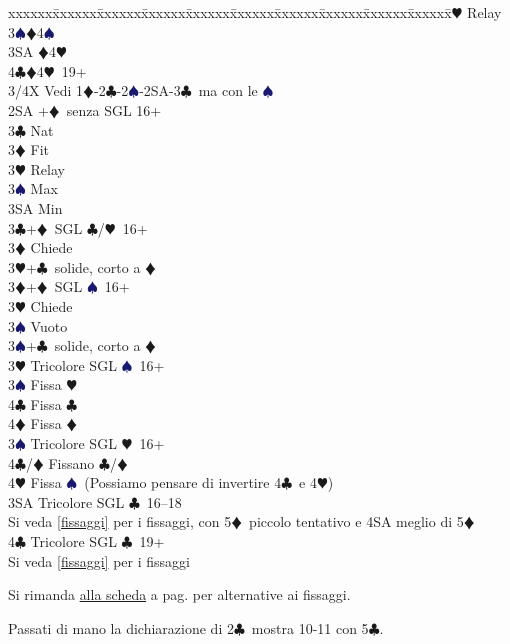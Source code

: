 \documentclass[a4paper,italian]{article}
\newcommand{\BC}{\textcolor{OliveGreen}{$\clubsuit$}}
\newcommand{\BD}{\textcolor{RedOrange}{$\vardiamondsuit$}}
\newcommand{\BH}{\textcolor{Red2}{$\varheartsuit${}}}
\newcommand{\BS}{\textcolor{MidnightBlue}{$\spadesuit${}}}
\newenvironment{bidtable}
{\begin{tabbing}

    xxxxxx\=xxxxxx\=xxxxxx\=xxxxxx\=xxxxxx\=xxxxxx\=xxxxxx\=xxxxxx\=xxxxxx\=xxxxxx\=\kill}
{\end{tabbing} }%
\begin{document}
\begin{bidtable}
    3\BH \> Relay\+\\
    3\BS {}\BD 4\BS \\
    3\small{SA} \BD 4\BH \\
    4\BC {}\BD 4\BH\ 19+\-\-\\
    3/4X \> Vedi 1\BD -2\BC -2\BS -2\small{SA}-3\BC\ ma con le \BS \-\-\\
    2\small{SA} +\BD\ senza SGL 16+\+\\
    3\BC \> Nat\\
    3\BD \> Fit\\
    3\BH \> Relay\+\\
    3\BS \> Max\\
    3\small{SA} \> Min\-\-\\
    3\BC {}+\BD\ SGL \BC /\BH\ 16+\+\\
    3\BD \> Chiede\\
    3\BH {}+\BC\ solide, corto a \BD \-\\
    3\BD {}+\BD\ SGL \BS\ 16+\+\\
    3\BH \> Chiede\+\\
    3\BS \> Vuoto\-\\
    3\BS {}+\BC\ solide, corto a \BD \-\\
    3\BH \> Tricolore SGL \BS\ 16+\+\\
    3\BS \> Fissa \BH \\
    4\BC \> Fissa \BC \\
    4\BD \> Fissa \BD \-\\
    3\BS \> Tricolore SGL \BH\ 16+\+\\
    4\BC/\BD \> Fissano \BC /\BD \\
    4\BH \> Fissa \BS\ (Possiamo pensare di invertire 4\BC\ e 4\BH )\-\\
    3\small{SA} \> Tricolore SGL \BC\ 16--18\+\\
    Si veda \ref{fissaggi} per i fissaggi, con 5\BD\ piccolo tentativo e 4\small{SA} meglio di 5\BD\-\\
    4\BC \> Tricolore SGL \BC\ 19+\+\\
    Si veda \ref{fissaggi} per i fissaggi\-\-
\end{bidtable}
\bigbreak
Si rimanda \hyperref[fissaggi]{alla scheda} a pag. \pageref{fissaggi} per alternative ai fissaggi.

Passati di mano la dichiarazione di 2\BC\ mostra 10-11 con 5\BC .
\end{document}
